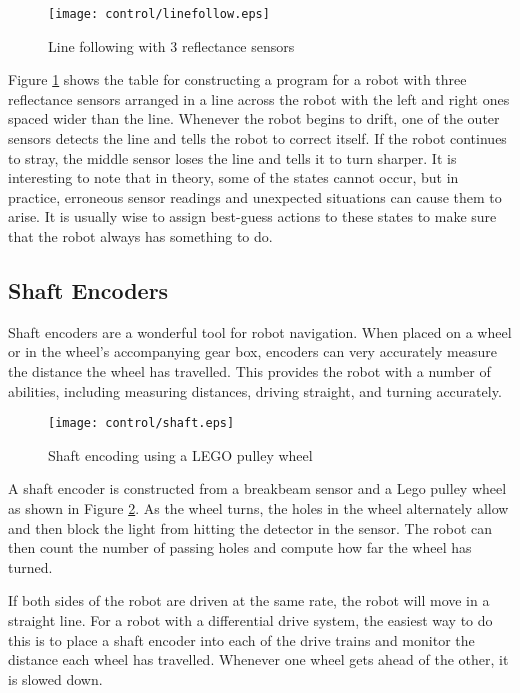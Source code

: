 \begin{figure}[htbp]
\begin{center}
\texttt{[image: control/linefollow.eps]}
 \caption{Line following with 3 reflectance sensors}
 \label{linefollow3}
\end{center}
\end{figure}

Figure \ref{linefollow3} shows the table for constructing a program
for a robot with three reflectance sensors arranged in a line across
the robot with the left and right ones spaced wider than the
line. Whenever the robot begins to drift, one of the outer sensors
detects the line and tells the robot to correct itself.  If the robot
continues to stray, the middle sensor loses the line and tells it to
turn sharper.  It is interesting to note that in theory, some of the
states cannot occur, but in practice, erroneous sensor readings and
unexpected situations can cause them to arise. It is usually wise to
assign best-guess actions to these states to make sure that the robot
always has something to do.

\subsection{Shaft Encoders}

Shaft encoders are a wonderful tool for robot navigation.  When placed
on a wheel or in the wheel's accompanying gear box, encoders can very
accurately measure the distance the wheel has travelled.  This
provides the robot with a number of abilities, including measuring
distances, driving straight, and turning accurately.

\begin{figure}[htbp]
\begin{center}
\texttt{[image: control/shaft.eps]}
 \caption{Shaft encoding using a LEGO pulley wheel}
 \label{shaft}
\end{center}
\end{figure}

A shaft encoder is constructed from a breakbeam sensor and a Lego
pulley wheel as shown in Figure \ref{shaft}. As the wheel turns, the
holes in the wheel alternately allow and then block the light from
hitting the detector in the sensor. The robot can then count the
number of passing holes and compute how far the wheel has turned.

If both sides of the robot are driven at the same rate, the robot will
move in a straight line. For a robot with a differential drive system,
the easiest way to do this is to place a shaft encoder into each of
the drive trains and monitor the distance each wheel has travelled.
Whenever one wheel gets ahead of the other, it is slowed down.

